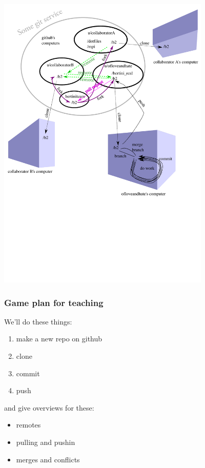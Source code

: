 \documentclass[14pt,aspectratio=1610]{beamer} %
\newcommand{\fframe}[2]{
   \begin{frame}
\frametitle{#1}
#2
\end{frame}
}
\begin{document}
\fframe{}
{\begin{center}\includegraphics[width=4in]{git_usage.pdf}\end{center}}


\fframe{Game plan for teaching}
{

We'll do these things:
	\begin{enumerate}
 
		\item make a new repo on github
		\item clone
		\item commit
		\item push 

	\end{enumerate}

and give overviews for these:
	\begin{itemize}
		\item remotes
		\item pulling and pushin
		\item merges and conflicts
	\end{itemize}
	
}
\end{document}
